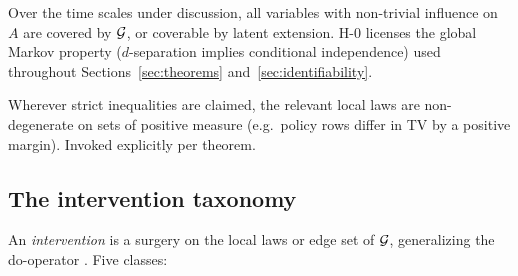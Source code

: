 \begin{assumption}\label{ass:h0}
Over the time scales under discussion, all variables with non-trivial influence
on $A$ are covered by $\mathcal{G}$, or coverable by latent extension. H-0 licenses
the global Markov property ($d$-separation implies conditional independence)
used throughout Sections~\ref{sec:theorems} and~\ref{sec:identifiability}.
\end{assumption}

\begin{assumption}\label{ass:faith}
Wherever strict inequalities are claimed, the relevant local laws are
non-degenerate on sets of positive measure (e.g.\ policy rows differ in TV by a
positive margin). Invoked explicitly per theorem.
\end{assumption}

\subsection{The intervention taxonomy}\label{sec:taxonomy}

An \emph{intervention} is a surgery on the local laws or edge set of $\mathcal{G}$,
generalizing the do-operator \citep{peters2017}. Five classes:

